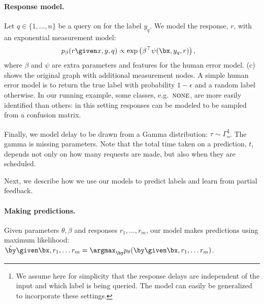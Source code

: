 
\paragraph{Response model.}
Let $q \in \{1, \ldots, n\}$ be a query on for the label $y_q$.
We model the response, $r$, with an exponential measurement model:
\begin{align*}
  p_\beta(r \given x, y, q) 
  &\propto \exp \left( \beta^\top\psi(\bx, y_q, r) \right),
\end{align*}
where $\beta$ and $\psi$ are extra parameters and features for the human error model. 
(c) shows the original graph with additional measurement nodes.
A simple human error model is to return the true label with probability $1-\epsilon$ and a random label otherwise.
In our running example, some classes, e.g.\ $\textsc{none}$, are more easily identified than others: in this setting responses can be modeled to be sampled from a confusion matrix.

Finally, we model delay to be drawn from a Gamma distribution: $\tau \sim \Gamma$\footnote{We assume here for simplicity that the response delays are independent of the input and which label is being queried. The model can easily be generalized to incorporate these settings.}.
\ac{The gamma is missing parameters.}
Note that the total time taken on a prediction, $t$, depends not only on how many requests are made, but also when they are scheduled.

Next, we describe how we use our models to predict labels and learn from partial feedback.

\paragraph{Making predictions.}
Given parameters $\theta, \beta$ and responses $r_1, \ldots, r_m$, our model makes predictions using maximum likelihood:
$\byt \given \bx, r_1, \ldots r_m = \argmax_{\by} \p(\by \given \bx, r_1, \ldots r_m)$.

